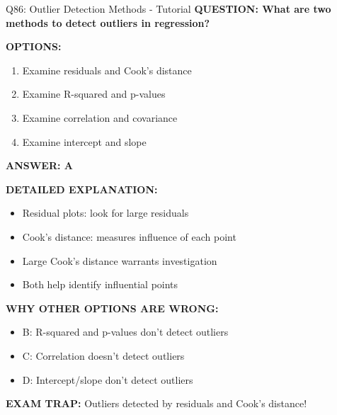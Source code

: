 \documentclass[8pt]{beamer}
\begin{document}
	\begin{frame}{Q86: Outlier Detection Methods - Tutorial}
		\fontsize{6.5}{7.5}\selectfont
		\textbf{QUESTION: What are two methods to detect outliers in regression?}
		
		\vspace{0.1cm}
		\textbf{OPTIONS:}
		\begin{enumerate}
			\item Examine residuals and Cook's distance
			\item Examine R-squared and p-values
			\item Examine correlation and covariance
			\item Examine intercept and slope
		\end{enumerate}
		
		\vspace{0.1cm}
		\textcolor{myblue}{\textbf{ANSWER: A}}
		
		\vspace{0.1cm}
		\textbf{DETAILED EXPLANATION:}
		\begin{itemize}
			\item Residual plots: look for large residuals
			\item Cook's distance: measures influence of each point
			\item Large Cook's distance warrants investigation
			\item Both help identify influential points
		\end{itemize}
		
		\vspace{0.1cm}
		\textcolor{myred}{\textbf{WHY OTHER OPTIONS ARE WRONG:}}
		\begin{itemize}
			\item \textcolor{myred}{B:} R-squared and p-values don't detect outliers
			\item \textcolor{myred}{C:} Correlation doesn't detect outliers
			\item \textcolor{myred}{D:} Intercept/slope don't detect outliers
		\end{itemize}
		
		\textcolor{myred}{\textbf{EXAM TRAP:}} Outliers detected by \textcolor{myblue}{residuals and Cook's distance}!
	\end{frame}
	
\end{document}
